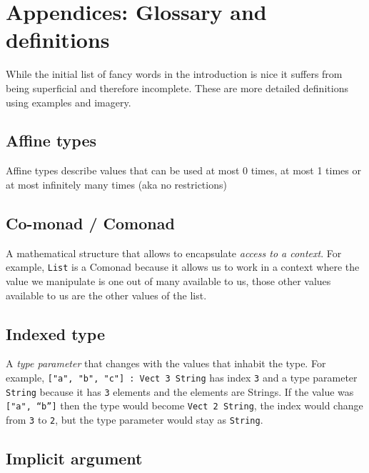 \documentclass[
]{article}
\begin{document}
\newpage

\hypertarget{appendices-glossary-and-definitions}{%
\section{Appendices: Glossary and
definitions}\label{appendices-glossary-and-definitions}}

While the initial list of fancy words in the introduction is nice it
suffers from being superficial and therefore incomplete. These are more
detailed definitions using examples and imagery.

\hypertarget{affine-types}{%
\subsection{Affine types}\label{affine-types}}

Affine types describe values that can be used at most 0 times, at most 1
times or at most infinitely many times (aka no restrictions)

\hypertarget{co-monad-comonad}{%
\subsection{Co-monad / Comonad}\label{co-monad-comonad}}

A mathematical structure that allows to encapsulate \emph{access to a
context}. For example, \texttt{List} is a Comonad because it allows us
to work in a context where the value we manipulate is one out of many
available to us, those other values available to us are the other values
of the list.

\hypertarget{indexed-type}{%
\subsection{Indexed type}\label{indexed-type}}

A \emph{type parameter} that changes with the values that inhabit the
type. For example, \texttt{{[}"a",\ "b",\ "c"{]}\ :\ Vect\ 3\ String}
has index \texttt{3} and a type parameter \texttt{String} because it has
\texttt{3} elements and the elements are Strings. If the value was
\texttt{{[}\textasciigrave{}"a",\ “b”{]}} then the type would become
\texttt{Vect\ 2\ String}, the index would change from \texttt{3} to
\texttt{2}, but the type parameter would stay as \texttt{String}.

\hypertarget{implicit-argument}{%
\subsection{Implicit argument}\label{implicit-argument}}
\end{document}
